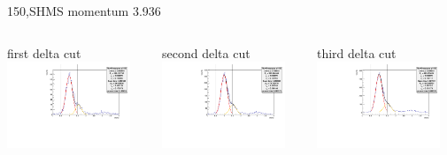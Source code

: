 \documentclass[aspectratio=169,xcolor=dvipsnames]{beamer}
\begin{document}
\begin{frame}{150,SHMS momentum 3.936}
\begin{columns}
\begin{column}[T]{0.3\textwidth}
first delta cut \\
\includegraphics[width = 0.9\textwidth]{results/pid/rftime/rftime_pos_150_0_pi.pdf}
\end{column}
\begin{column}[T]{0.3\textwidth}
second delta cut \\
\includegraphics[width = 0.9\textwidth]{results/pid/rftime/rftime_pos_150_1_pi.pdf}
\end{column}
\begin{column}[T]{0.3\textwidth}
third delta cut \\
\includegraphics[width = 0.9\textwidth]{results/pid/rftime/rftime_pos_150_2_pi.pdf}

\end{column}
\end{columns}
\end{frame}
\end{document}
